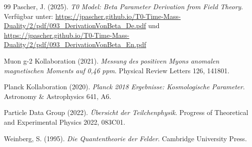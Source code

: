 \begin{thebibliography}{99}
		Pascher, J. (2025). \textit{T0 Model: Beta Parameter Derivation from Field Theory}. Verfügbar unter: \url{https://jpascher.github.io/T0-Time-Mass-Duality/2/pdf/093_DerivationVonBeta_De.pdf} und \url{https://jpascher.github.io/T0-Time-Mass-Duality/2/pdf/093_DerivationVonBeta_En.pdf}
		
		Muon g-2 Kollaboration (2021). \textit{Messung des positiven Myons anomalen magnetischen Moments auf 0,46 ppm}. Physical Review Letters 126, 141801.
		
		Planck Kollaboration (2020). \textit{Planck 2018 Ergebnisse: Kosmologische Parameter}. Astronomy \& Astrophysics 641, A6.
		
		Particle Data Group (2022). \textit{Übersicht der Teilchenphysik}. Progress of Theoretical and Experimental Physics 2022, 083C01.
		
		Weinberg, S. (1995). \textit{Die Quantentheorie der Felder}. Cambridge University Press.
	\end{thebibliography}
	